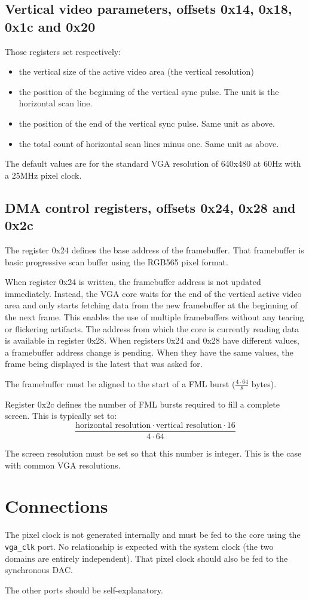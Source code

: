 \documentclass[a4paper,11pt]{article}
\begin{document}
\subsection{Vertical video parameters, offsets 0x14, 0x18, 0x1c and 0x20}
Those registers set respectively:
\begin{itemize}
\item the vertical size of the active video area (the vertical resolution)
\item the position of the beginning of the vertical sync pulse. The unit is the horizontal scan line.
\item the position of the end of the vertical sync pulse. Same unit as above.
\item the total count of horizontal scan lines minus one. Same unit as above.
\end{itemize}
The default values are for the standard VGA resolution of 640x480 at 60Hz with a 25MHz pixel clock.

\subsection{DMA control registers, offsets 0x24, 0x28 and 0x2c}
The register 0x24 defines the base address of the framebuffer. That framebuffer is basic progressive scan buffer using the RGB565 pixel format.

When register 0x24 is written, the framebuffer address is not updated immediately. Instead, the VGA core waits for the end of the vertical active video area and only starts fetching data from the new framebuffer at the beginning of the next frame. This enables the use of multiple framebuffers without any tearing or flickering artifacts. The address from which the core is currently reading data is available in register 0x28.
When registers 0x24 and 0x28 have different values, a framebuffer address change is pending. When they have the same values, the frame being displayed is the latest that was asked for.

The framebuffer must be aligned to the start of a FML burst ($\frac{4 \cdot 64}{8}$ bytes).

Register 0x2c defines the number of FML bursts required to fill a complete screen. This is typically set to:
\[
\frac{\text{horizontal resolution} \cdot \text{vertical resolution} \cdot 16}{4 \cdot 64}
\]

The screen resolution must be set so that this number is integer. This is the case with common VGA resolutions.

\section{Connections}
The pixel clock is not generated internally and must be fed to the core using the \verb!vga_clk! port. No relationship is expected with the system clock (the two domains are entirely independent). That pixel clock should also be fed to the synchronous DAC.

The other ports should be self-explanatory.
\end{document}
